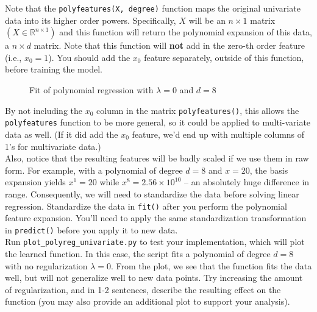 \documentclass{article}
\begin{document}
\begin{aprob}
    Note that the \texttt{polyfeatures(X, degree)} function maps the original univariate data into its higher order powers.  Specifically, $X$ will be an $n \times 1$ matrix $(X \in \mathbb{R}^{n \times 1})$ and this function will return the polynomial expansion of this data, a $n \times d$ matrix.  Note that this function will {\bf not} add in the zero-th order feature (i.e., $x_0 = 1$).  You should add the $x_0$ feature separately, outside of this function, before training the model.

    \begin{figure}
        \centering
        \vspace{-1em}
        \vspace{-1em}
        \caption{Fit of polynomial regression with $\lambda = 0$ and $d = 8$}\label{fig:polyregUnivariate}
        \vspace{-2em}
    \end{figure}

    By not including the $x_0$ column in the matrix \texttt{polyfeatures()}, this allows the \texttt{polyfeatures} function to be more general, so it could be applied to multi-variate data as well. (If it did add the $x_0$ feature, we'd end up with multiple columns of 1's for multivariate data.)\\
    
    Also, notice that the resulting features will be badly scaled if we use them in raw form.  For example, with a polynomial of degree $d = 8$ and $x = 20$, the basis expansion yields $x^1 = 20$ while $x^8 = 2.56 \times 10^{10}$ -- an
    absolutely huge difference in range.  Consequently, we will need to standardize the data before solving linear regression.  Standardize the data in \texttt{fit()} after you perform the polynomial feature expansion.  You'll need to apply the same standardization transformation in \texttt{predict()} before you apply it to new data.\\
    
    Run \texttt{plot\_polyreg\_univariate.py} to test your implementation, which will plot the learned function.  In this case, the script fits a polynomial of degree $d=8$ with no regularization $\lambda = 0$.  From the plot, we see that the function fits the data well, but will not generalize well to new data points.  Try increasing the amount of regularization, and in 1-2 sentences, describe the resulting effect on the function (you may also provide an additional plot to support your analysis).
    

\end{aprob}
\end{document}
